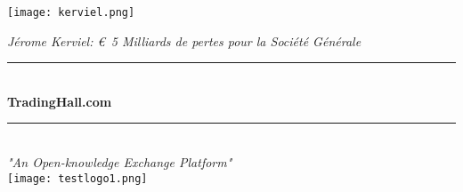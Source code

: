 \documentclass[14pt,a4paper]{beamer}
\newcommand{\HRule}{\rule{\linewidth}{0.5mm}}
\begin{document}
\begin{frame}




\end{frame}


\begin{frame}


\texttt{[image: kerviel.png]}

\emph{Jérome Kerviel: \euro~5 Milliards de pertes pour la Société Générale}

\end{frame}



\begin{frame}
\begin{center}



\end{center}
\end{frame}

\begingroup
{}
\begin{frame}
\begin{center}


\HRule \\[0.4cm]
{\huge \bfseries \color{title}TradingHall.com}\\
\HRule \\[0.4cm]


\emph{"An Open-knowledge Exchange Platform"}\\[1cm]




\texttt{[image: testlogo1.png]}

\vfill


\end{center}
\end{frame}
\endgroup
\end{document}
